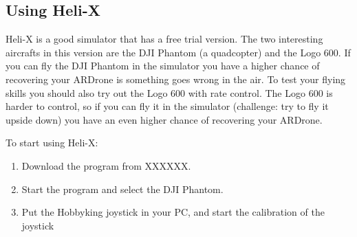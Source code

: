 \documentclass{article}
\begin{document}
\subsection*{Using Heli-X}
Heli-X is a good simulator that has a free trial version. The two interesting aircrafts in this version are the DJI Phantom (a quadcopter) and the Logo 600. If you can fly the DJI Phantom in the simulator you have a higher chance of recovering your ARDrone is something goes wrong in the air. To test your flying skills you should also try out the Logo 600 with rate control. The Logo 600 is harder to control, so if you can fly it in the simulator (challenge: try to fly it upside down) you have an even higher chance of recovering your ARDrone. 
 
To start using Heli-X:
\begin{enumerate}
\item Download the program from XXXXXX. 
\item Start the program and select the DJI Phantom.
\item Put the Hobbyking joystick in your PC, and start the calibration of the joystick
\end{enumerate}
\end{document}
